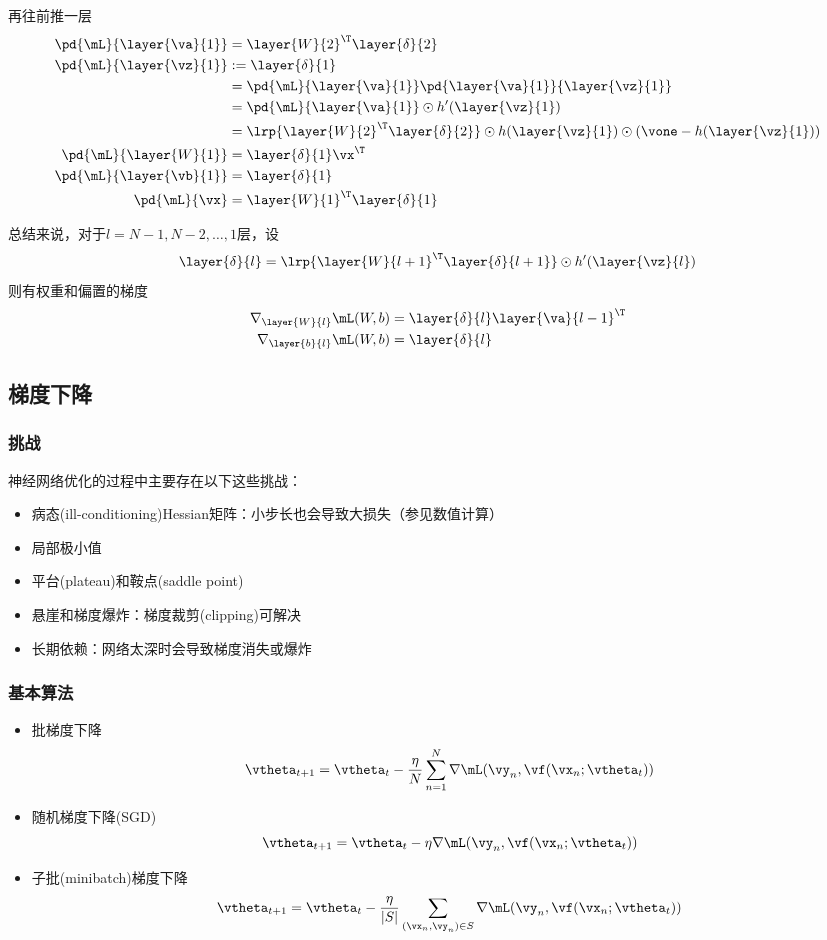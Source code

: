 再往前推一层
\[\begin{aligned}
\pd{\mL}{\layer{\va}{1}}
&=\layer{W}{2}^\T\layer{\delta}{2}\\
\pd{\mL}{\layer{\vz}{1}}
&:=\layer{\delta}{1}\\
&=\pd{\mL}{\layer{\va}{1}}\pd{\layer{\va}{1}}{\layer{\vz}{1}}\\
&=\pd{\mL}{\layer{\va}{1}}\odot h'(\layer{\vz}{1})\\
&=\lrp{\layer{W}{2}^\T\layer{\delta}{2}}\odot h(\layer{\vz}{1})\odot (\vone-h(\layer{\vz}{1}))\\
\pd{\mL}{\layer{W}{1}}&=\layer{\delta}{1}\vx^\T\\
\pd{\mL}{\layer{\vb}{1}}&=\layer{\delta}{1}\\
\pd{\mL}{\vx}&=\layer{W}{1}^\T\layer{\delta}{1}
\end{aligned}\]

总结来说，对于$l=N-1,N-2,\ldots,1$层，设\textcolor{red}{
\[\layer{\delta}{l}=\lrp{\layer{W}{l+1}^\T\layer{\delta}{l+1}}\odot h'(\layer{\vz}{l})\]
}
则有权重和偏置的梯度\textcolor{red}{
\[\begin{aligned}
\nabla_{\layer{W}{l}}\mL(W,b)&=\layer{\delta}{l}\layer{\va}{l-1}^\T\\
\nabla_{\layer{b}{l}}\mL(W,b)&=\layer{\delta}{l}
\end{aligned}\]
}

\subsection{梯度下降}
\subsubsection{挑战}
神经网络优化的过程中主要存在以下这些挑战：
\begin{itemize}
    \item 病态(ill-conditioning)Hessian矩阵：小步长也会导致大损失（参见数值计算）
    \item 局部极小值
    \item 平台(plateau)和鞍点(saddle point)
    \item 悬崖和梯度爆炸：梯度裁剪(clipping)可解决
    \item 长期依赖：网络太深时会导致梯度消失或爆炸
\end{itemize}

\subsubsection{基本算法}
\begin{itemize}
    \item 批梯度下降
    \[\vtheta_{t+1}=\vtheta_t-\frac{\eta}{N}\sum_{n=1}^N\nabla\mL(\vy_n,\vf(\vx_n;\vtheta_t))\]
    \item 随机梯度下降(SGD)
    \[\vtheta_{t+1}=\vtheta_t-\eta\nabla\mL(\vy_n,\vf(\vx_n;\vtheta_t))\]
    \item 子批(minibatch)梯度下降
    \[\vtheta_{t+1}=\vtheta_t-\frac{\eta}{|S|}\sum_{(\vx_n,\vy_n)\in S}\nabla\mL(\vy_n,\vf(\vx_n;\vtheta_t))\]
\end{itemize}

